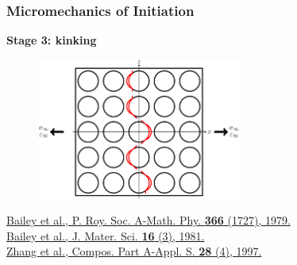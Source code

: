 \documentclass[first,firstsupp,lastsupp,last,hyperref,table]{ETHclass}
\begin{document}
\begin{frame}
\frametitle{\vspace{0.2cm}\small Micromechanics of Initiation}
\vspace{-0.5cm}
\centering
\begin{alertblock}{\centering\scriptsize\bf Stage 3: kinking}
\vspace{-0.25cm}
\begin{figure}
\centering
\includegraphics[width=0.6\textwidth]{stage3-kinking.pdf}
\end{figure}
\end{alertblock}
\vspace{-0.5cm}
\pgfmathsetmacro{}
\pgfmathsetmacro{}
{\fontsize{\fontsizeref}{\stretchref} \selectfont \href{https://doi.org/10.1098/rspa.1979.0071}{Bailey et al., P. Roy. Soc. A-Math. Phy. \textbf{366} (1727), 1979.}}\\\vspace{-5pt}
{\fontsize{\fontsizeref}{\stretchref} \selectfont \href{https://doi.org/10.1007/BF00552203}{Bailey et al., J. Mater. Sci. \textbf{16} (3), 1981.}}\\\vspace{-5pt}
{\fontsize{\fontsizeref}{\stretchref} \selectfont \href{https://doi.org/10.1016/S1359-835X(96)00123-6}{Zhang et al., Compos. Part A-Appl. S. \textbf{28} (4), 1997.}}
\end{frame}

\addtocounter{framenumber}{-1}
\end{document}
